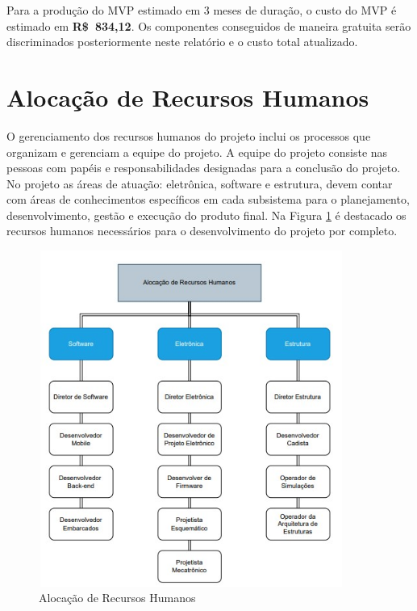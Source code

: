 Para a produção do MVP estimado em 3 meses de duração, o custo do MVP é estimado em \textbf{R\$\ 834,12}. Os componentes conseguidos de maneira gratuita serão discriminados posteriormente neste relatório e o custo total atualizado.

\section{Alocação de Recursos Humanos}
O gerenciamento dos recursos humanos do projeto inclui os processos que organizam e gerenciam a equipe do projeto. A equipe do projeto consiste nas pessoas com papéis e responsabilidades designadas para a conclusão do projeto. No projeto as áreas de atuação: eletrônica, software e estrutura, devem contar com áreas de conhecimentos específicos em cada subsistema para o planejamento, desenvolvimento, gestão e execução do produto final. Na Figura \ref{Alocação de Recursos Humanos} é destacado os recursos humanos necessários para o desenvolvimento do projeto por completo.

\begin{figure}[h!]
\begin{center}
\includegraphics[width= 10cm, height=11cm]{figuras/Recursos_humanos.jpg}
\caption{Alocação de Recursos Humanos}
\label{Alocação de Recursos Humanos}
\end{center}
\end{figure}

